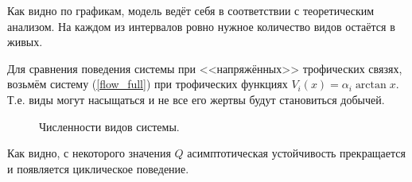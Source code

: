 Как видно по графикам, модель ведёт себя в соответствии с теоретическим анализом. На каждом из интервалов ровно нужное количество видов остаётся в живых. 

Для сравнения поведения системы при <<напряжённых>> трофических связях, возьмём систему (\ref{flow_full}) при трофических функциях \( V_i(x) = \alpha_i \arctan x \). Т.е. виды могут насыщаться и не все его жертвы будут становиться добычей.


\begin{figure}[H]
    \centering
\caption{Численности видов системы.}  \label{fig:flow_exp2}
\end{figure}

Как видно, с некоторого значения \(Q\) асимптотическая устойчивость прекращается и появляется циклическое поведение.